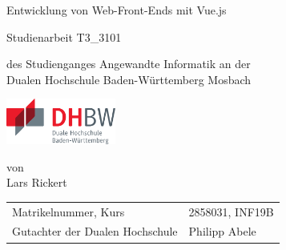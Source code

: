 \def\doctype{Dokumententyp}
\def\title{Entwicklung von Web-Front-Ends mit Vue.js}
\def\author{Lars Rickert}

\begin{titlepage}

	\vspace{10mm}

	\begin{center}
		\vspace{5mm}

		\huge \title

		\vspace{14.2pt}



		\vspace{42.6pt}

		\large Studienarbeit T3\_3101

		\vspace{42.6pt}

		\small des Studienganges Angewandte Informatik an der \\
		\large Dualen Hochschule Baden-Württemberg Mosbach

		\vspace{14.2pt}

		\includegraphics[height=1.5cm]{prefix/image/logo-dhbw.pdf}

		\vspace{42.6pt}

		\small von \\
		\large \author
	\end{center}

	\vspace{140pt}

	\begin{table}[h]
		\centering
		\begin{tabular}{ll}
			\small Matrikelnummer, Kurs            & 2858031, INF19B \\
			\small Gutachter der Dualen Hochschule & Philipp Abele   \\
		\end{tabular}
	\end{table}

	\vspace{49.7pt}


\end{titlepage}
